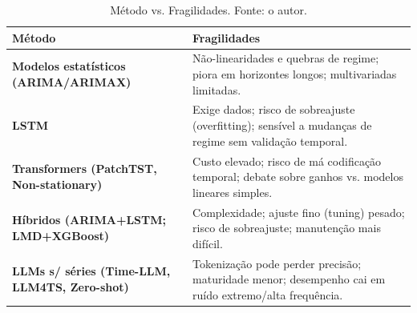 \begin{table}[H]
  \centering
  \caption{Método vs. Fragilidades. Fonte: o autor.}
  \label{tab:metodo-fragilidades}
  \scriptsize
  \setlength{\tabcolsep}{4pt}\renewcommand{\arraystretch}{1.15}
  \begin{tabularx}{\textwidth}{>{\bfseries}l Y}
    \toprule
    Método & Fragilidades \\
    \midrule
    Modelos estatísticos (ARIMA/ARIMAX) & Não-linearidades e quebras de regime; piora em horizontes longos; multivariadas limitadas. \\
    LSTM & Exige dados; risco de sobreajuste (overfitting); sensível a mudanças de regime sem validação temporal. \\
    Transformers (PatchTST, Non-stationary) & Custo elevado; risco de má codificação temporal; debate sobre ganhos vs. modelos lineares simples. \\
    Híbridos (ARIMA+LSTM; LMD+XGBoost) & Complexidade; ajuste fino (tuning) pesado; risco de sobreajuste; manutenção mais difícil. \\
    LLMs s/ séries (Time-LLM, LLM4TS, Zero-shot) & Tokenização pode perder precisão; maturidade menor; desempenho cai em ruído extremo/alta frequência. \\
    \bottomrule
  \end{tabularx}
\end{table}





